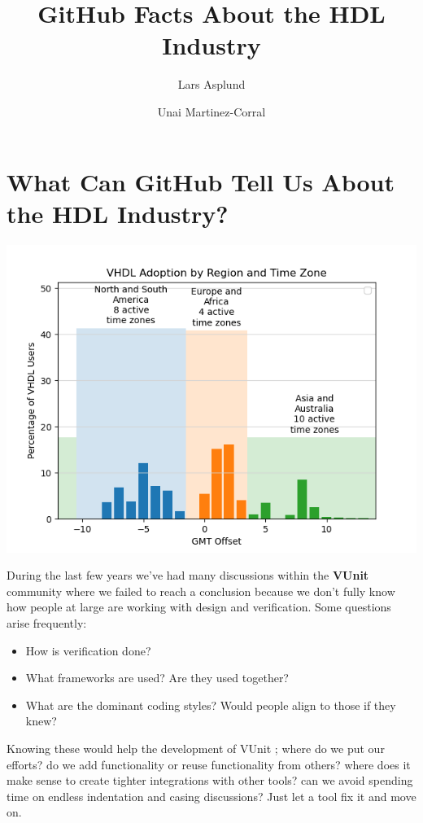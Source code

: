 \documentclass[]{report}
\title{GitHub Facts About the HDL Industry}
\author{Lars Asplund \and Unai Martinez-Corral}
\date{}
\providecommand{\tightlist}{%
  \setlength{\itemsep}{0pt}\setlength{\parskip}{0pt}}
\begin{document}
\maketitle

{
\setcounter{tocdepth}{3}
\tableofcontents
}
\listoffigures


\hypertarget{index}{%
\chapter{What Can GitHub Tell Us About the HDL Industry?}\label{index}}

\begin{center}\includegraphics[width=0.85\linewidth]{img/vhdl_adoption_by_region} \end{center}

During the last few years we've had many discussions within the \textbf{VUnit} community where we failed to reach a conclusion because we don't fully know how people at large are working with design and verification. Some questions arise frequently:

\begin{itemize}
\tightlist
\item
  How is verification done?
\item
  What frameworks are used? Are they used together?
\item
  What are the dominant coding styles? Would people align to those if they knew?
\end{itemize}

Knowing these would help the development of VUnit \autocite{vunit}; where do we put our efforts? do we add functionality or reuse functionality from others? where does it make sense to create tighter integrations with other tools? can we avoid spending time on endless indentation and casing discussions? Just let a tool fix it and move on.
\end{document}

